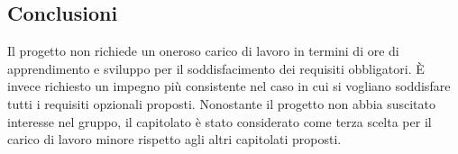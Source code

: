 \documentclass[../studio-di-fattibilita.tex]{subfiles}
\begin{document}
  \subsection{Conclusioni}%
  \label{subsec:conclusioni}
  Il progetto non richiede un oneroso carico di lavoro in termini di ore di apprendimento e sviluppo per il soddisfacimento dei requisiti obbligatori. È invece richiesto un impegno più consistente nel caso in cui si vogliano soddisfare tutti i requisiti opzionali proposti.
  Nonostante il progetto non abbia suscitato interesse nel gruppo, il capitolato è stato considerato come terza scelta per il carico di lavoro minore rispetto agli altri capitolati proposti.
\end{document}
